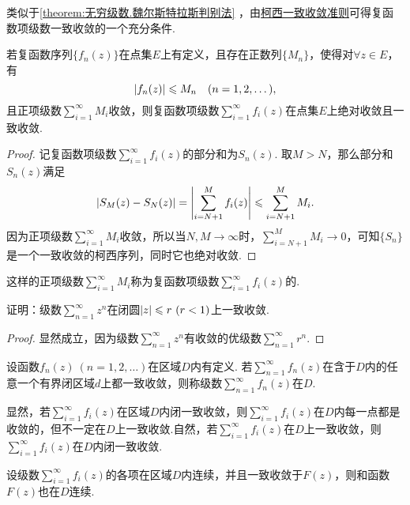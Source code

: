 类似于\cref{theorem:无穷级数.魏尔斯特拉斯判别法} ，由\hyperref[theorem:无穷级数.柯西一致收敛准则]{柯西一致收敛准则}可得复函数项级数一致收敛的一个充分条件.
\begin{corollary}\label{theorem:无穷级数.优级数准则}
若复函数序列\(\{f_n(z)\}\)在点集\(E\)上有定义，且存在正数列\(\{M_n\}\)，使得对\(\forall z \in E\)，有\[
\abs{f_n(z)} \leqslant M_n
\quad(n=1,2,\dotsc),
\]且正项级数\(\sum\limits_{i=1}^{\infty} M_i\)收敛，则复函数项级数\(\sum\limits_{i=1}^{\infty} f_i(z)\)在点集\(E\)上绝对收敛且一致收敛.
\begin{proof}
记复函数项级数\(\sum\limits_{i=1}^{\infty} f_i(z)\)的部分和为\(S_n(z)\).
取\(M > N\)，那么部分和\(S_n(z)\)满足\[
\abs{S_M(z) - S_N(z)}
= \abs{\sum\limits_{i=N+1}^M f_i(z)}
\leqslant \sum\limits_{i=N+1}^M M_i.
\]因为正项级数\(\sum\limits_{i=1}^{\infty} M_i\)收敛，所以当\(N,M \to \infty\)时，\(\sum\limits_{i=N+1}^M M_i \to 0\)，可知\(\{S_n\}\)是一个一致收敛的柯西序列，同时它也绝对收敛.
\end{proof}
\end{corollary}
这样的正项级数\(\sum\limits_{i=1}^{\infty} M_i\)称为复函数项级数\(\sum\limits_{i=1}^{\infty} f_i(z)\)的.

\begin{example}
证明：级数\(\sum\limits_{n=1}^{\infty} z^n\)在闭圆\(\abs{z} \leqslant r\ (r<1)\)上一致收敛.
\begin{proof}
显然成立，因为级数\(\sum\limits_{n=1}^{\infty} z^n\)有收敛的优级数\(\sum\limits_{n=1}^{\infty} r^n\).
\end{proof}
\end{example}

\begin{definition}
设函数\(f_n(z)\ (n=1,2,\dots)\)在区域\(D\)内有定义.
若\(\sum\limits_{n=1}^{\infty} f_n(z)\)在含于\(D\)内的任意一个有界闭区域\(d\)上都一致收敛，则称级数\(\sum\limits_{n=1}^{\infty} f_n(z)\)在\(D\).
\end{definition}
显然，若\(\sum\limits_{i=1}^{\infty} f_i(z)\)在区域\(D\)内闭一致收敛，则\(\sum\limits_{i=1}^{\infty} f_i(z)\)在\(D\)内每一点都是收敛的，但不一定在\(D\)上一致收敛.自然，若\(\sum\limits_{i=1}^{\infty} f_i(z)\)在\(D\)上一致收敛，则\(\sum\limits_{i=1}^{\infty} f_i(z)\)在\(D\)内闭一致收敛.

\begin{theorem}\label{theorem:解析函数的级数表示.一致收敛级数的基本性质1}
设级数\(\sum\limits_{i=1}^{\infty} f_i(z)\)的各项在区域\(D\)内连续，并且一致收敛于\(F(z)\)，则和函数\(F(z)\)也在\(D\)连续.
\end{theorem}

